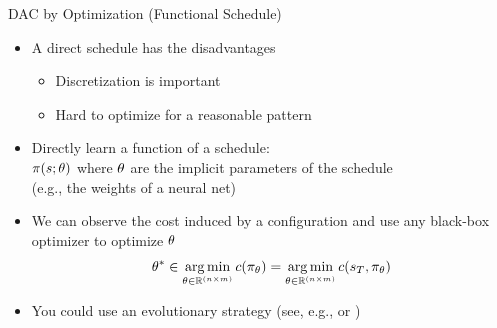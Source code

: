 \documentclass[main]{subfiles}
\begin{document}
\begin{frame}{DAC by Optimization (Functional Schedule)}
    \begin{itemize}
        \item A direct schedule has the disadvantages\pause
        \begin{itemize}
            \item Discretization is important
            \item Hard to optimize for a reasonable pattern
        \end{itemize}
        \item Directly learn a function of a schedule:\\
        $\pi(s;\theta)$ where $\theta$ are the implicit parameters of the schedule\\
        (e.g., the weights of a neural net)\pause
        \item We can observe the cost induced by a configuration and use any black-box optimizer to optimize $\theta$
        $$\theta^*\in\operatorname*{arg\,min}_{\theta\in\mathbb{R}^{(n\times m)}}c(\pi_\theta)=\operatorname*{arg\,min}_{\theta\in\mathbb{R}^{(n\times m)}}c(s_T,\pi_\theta)$$\pause
        \item You could use an evolutionary strategy (see, e.g., or )
    \end{itemize}
\end{frame}
\end{document}
